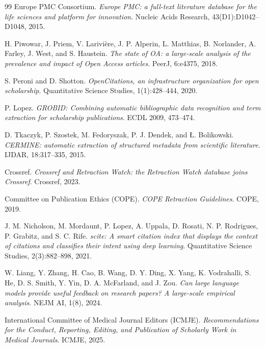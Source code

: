 \documentclass{article}
\begin{document}
{\begin{thebibliography}{99}
Europe PMC Consortium.
\textit{Europe PMC: a full-text literature database for the life sciences and platform for innovation}.
Nucleic Acids Research, 43(D1):D1042--D1048, 2015.

H. Piwowar, J. Priem, V. Larivi\`{e}re, J. P. Alperin, L. Matthias, B. Norlander, A. Farley, J. West, and S. Haustein.
\textit{The state of OA: a large-scale analysis of the prevalence and impact of Open Access articles}.
PeerJ, 6:e4375, 2018.

S. Peroni and D. Shotton.
\textit{OpenCitations, an infrastructure organization for open scholarship}.
Quantitative Science Studies, 1(1):428--444, 2020.

P. Lopez.
\textit{GROBID: Combining automatic bibliographic data recognition and term extraction for scholarship publications}.
ECDL 2009, 473--474.

D. Tkaczyk, P. Szostek, M. Fedoryszak, P. J. Dendek, and {\L}. Bolikowski.
\textit{CERMINE: automatic extraction of structured metadata from scientific literature}.
IJDAR, 18:317--335, 2015.

Crossref.
\textit{Crossref and Retraction Watch: the Retraction Watch database joins Crossref}.
Crossref, 2023.

Committee on Publication Ethics (COPE).
\textit{COPE Retraction Guidelines}.
COPE, 2019.

J. M. Nicholson, M. Mordaunt, P. Lopez, A. Uppala, D. Rosati, N. P. Rodrigues, P. Grabitz, and S. C. Rife.
\textit{scite: A smart citation index that displays the context of citations and classifies their intent using deep learning}.
Quantitative Science Studies, 2(3):882--898, 2021.

W. Liang, Y. Zhang, H. Cao, B. Wang, D. Y. Ding, X. Yang, K. Vodrahalli, S. He, D. S. Smith, Y. Yin, D. A. McFarland, and J. Zou.
\textit{Can large language models provide useful feedback on research papers? A large-scale empirical analysis}.
NEJM AI, 1(8), 2024.

International Committee of Medical Journal Editors (ICMJE).
\textit{Recommendations for the Conduct, Reporting, Editing, and Publication of Scholarly Work in Medical Journals}.
ICMJE, 2025.

\end{thebibliography}

}
\end{document}

